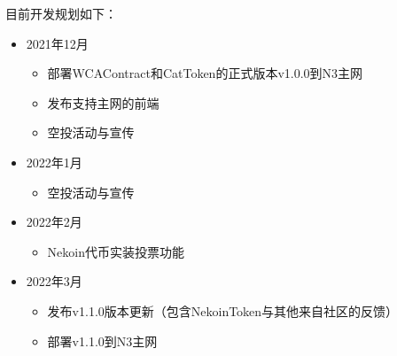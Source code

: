 目前开发规划如下：

\begin{itemize}
    \item 2021年12月
    \begin{itemize}
        \item 部署WCAContract和CatToken的正式版本v1.0.0到N3主网
        \item 发布支持主网的前端
        \item 空投活动与宣传
    \end{itemize}

    \item 2022年1月
    \begin{itemize}
        \item 空投活动与宣传
    \end{itemize}

    \item 2022年2月
    \begin{itemize}
        \item Nekoin代币实装投票功能
    \end{itemize}

    \item 2022年3月
    \begin{itemize}
        \item 发布v1.1.0版本更新（包含NekoinToken与其他来自社区的反馈）
        \item 部署v1.1.0到N3主网
    \end{itemize}
\end{itemize}
